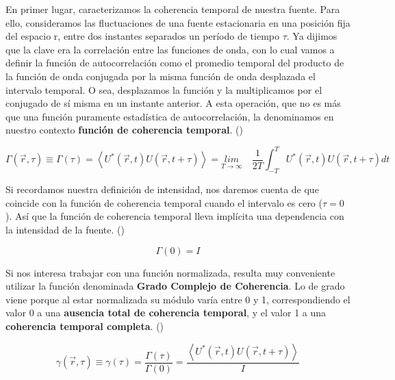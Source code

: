 \documentclass[12pt,a4paper]{report}
\newcommand{\esp}{\vspace{0.5cm}}
\begin{document}
	\esp
	
	En primer lugar, caracterizamos la coherencia temporal de nuestra fuente. Para ello, consideramos las fluctuaciones de una fuente estacionaria en una posición fija del espacio r, entre dos instantes separados un período de tiempo $\tau$. Ya dijimos que la clave era la correlación entre las funciones de onda, con lo cual vamos a definir la función de autocorrelación como el promedio temporal del producto de
	la función de onda conjugada por la misma función de onda desplazada el intervalo temporal. O sea, desplazamos la función y la multiplicamos por el conjugado de sí misma en un instante anterior. A esta operación, que no es más que una función puramente estadística de autocorrelación, la denominamos en nuestro contexto \textbf{función de coherencia temporal}. (\cite{Resumen})
	
	\begin{equation}
		\Gamma(\vec{r}, \tau) \equiv \Gamma(\tau) = \left< U^*(\vec{r}, t) U(\vec{r}, t + \tau) \right> = \underset{T \rightarrow \infty}{lim} \quad \frac{1}{2T} \int_{-T}^T U^*(\vec{r}, t) U(\vec{r}, t + \tau) dt
	\end{equation}
	
	\esp
	
	Si recordamos nuestra definición de intensidad, nos daremos cuenta de que coincide con la función de coherencia temporal cuando el intervalo es cero ($\tau = 0$). Así que la función de coherencia temporal lleva implícita una dependencia con la intensidad de la fuente. (\cite{Resumen})
	
	\esp
	
	\begin{equation}
		\Gamma(0) = I 
	\end{equation}
	
	\esp
	
	Si nos interesa trabajar con una función normalizada, resulta muy conveniente utilizar la función denominada \textbf{Grado Complejo de Coherencia}. Lo de grado viene porque al estar normalizada su módulo varía entre 0 y 1, correspondiendo el valor 0 a una \textbf{ausencia total de coherencia temporal}, y el valor 1 a una \textbf{coherencia temporal completa}. (\cite{Resumen})
	
	\esp
	
	\begin{equation}
		\gamma(\vec{r}, \tau) \equiv \gamma(\tau) =  \frac{\Gamma(\tau)}{\Gamma(0)} = \frac{\left< U^*(\vec{r}, t) U(\vec{r}, t + \tau) \right>}{I}
	\end{equation}
	
\end{document}
